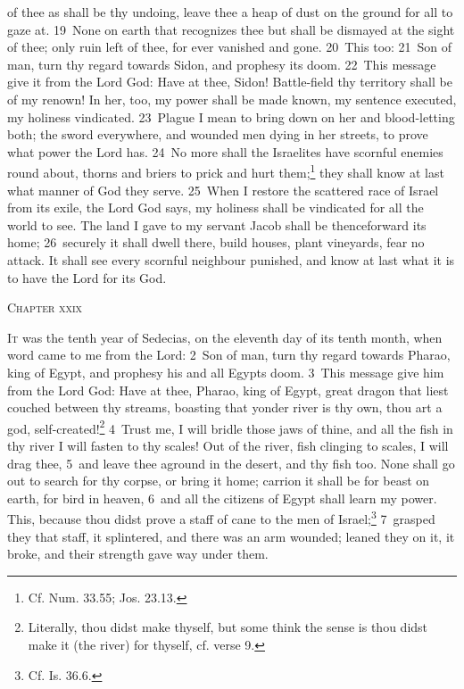 \documentclass[10pt]{book} %
\begin{document}
of thee as shall be thy undoing, leave thee a heap of dust on the ground for all to gaze at. \textcolor{benred8}{19}~None on earth that recognizes thee but shall be dismayed at the sight of thee; only ruin left of thee, for ever vanished and gone.
\textcolor{benred8}{20}~This too: \textcolor{benred8}{21}~Son of man, turn thy regard towards Sidon, and prophesy its doom. \textcolor{benred8}{22}~This message give it from the Lord God: Have at thee, Sidon! Battle-field thy territory shall be of my renown! In her, too, my power shall be made known, my sentence executed, my holiness vindicated. \textcolor{benred8}{23}~Plague I mean to bring down on her and blood-letting both; the sword everywhere, and wounded men dying in her streets, to prove what power the Lord has.
\textcolor{benred8}{24}~No more shall the Israelites have scornful enemies round about, thorns and briers to prick and hurt them;\footnote[5]{Cf. Num. 33.55; Jos. 23.13.} they shall know at last what manner of God they serve. \textcolor{benred8}{25}~When I restore the scattered race of Israel from its exile, the Lord God says, my holiness shall be vindicated for all the world to see. The land I gave to my servant Jacob shall be thenceforward its home; \textcolor{benred8}{26}~securely it shall dwell there, build houses, plant vineyards, fear no attack. It shall see every scornful neighbour punished, and know at last what it is to have the Lord for its God.
\begin{large}\begin{center}\textsc{Chapter xxix}\end{center}\end{large}
\lettrine[lines=2]{I}{t} was the tenth year of Sedecias, on the eleventh day of its tenth month, when word came to me from the Lord: \textcolor{benred8}{2}~Son of man, turn thy regard towards Pharao, king of Egypt, and prophesy his and all Egypt\textquotesingle s doom. \textcolor{benred8}{3}~This message give him from the Lord God: Have at thee, Pharao, king of Egypt, great dragon that liest couched between thy streams, boasting that yonder river is thy own, thou art a god, self-created!\footnote[1]{Literally, \textasciigrave thou didst make thyself\textquotesingle , but some think the sense is \textasciigrave thou didst make it (the river) for thyself\textquotesingle , cf. verse 9.} \textcolor{benred8}{4}~Trust me, I will bridle those jaws of thine, and all the fish in thy river I will fasten to thy scales! Out of the river, fish clinging to scales, I will drag thee, \textcolor{benred8}{5}~and leave thee aground in the desert, and thy fish too. None shall go out to search for thy corpse, or bring it home; carrion it shall be for beast on earth, for bird in heaven, \textcolor{benred8}{6}~and all the citizens of Egypt shall learn my power. This, because thou didst prove a staff of cane to the men of Israel;\footnote[2]{Cf. Is. 36.6.} \textcolor{benred8}{7}~grasped they that staff, it splintered, and there was an arm wounded; leaned they on it, it broke, and their strength gave way under them.
\end{document}
